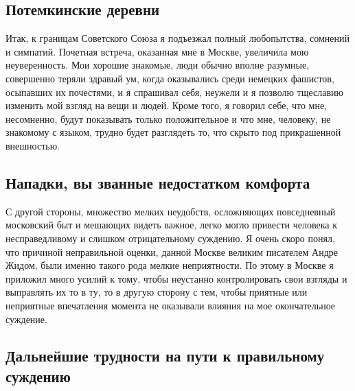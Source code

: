 \documentclass[12pt, a4paper, openany]{book}
\begin{document}
\subsection*{Потемкинские деревни}
Итак, к границам Советского Союза я подъезжал полный любопытства, сомнений и симпатий. Почетная встреча, оказанная мне в Москве, увеличила мою неуверенность. Мои хорошие знакомые, люди обычно вполне разумные, совершенно теряли здравый ум, когда оказывались среди немецких фашистов, осыпавших их почестями, и я спрашивал себя, неужели и я позволю тщеславию изменить мой взгляд на вещи и людей. Кроме того, я говорил себе, что мне, несомненно, будут показывать только положительное и что мне, человеку, не знакомому с языком, трудно будет разглядеть то, что скрыто под прикрашенной внешностью.

\subsection*{Нападки, вы званные недостатком комфорта}
  
С другой стороны, множество мелких неудобств, осложняющих повседневный московский быт и мешающих видеть важное, легко могло привести человека к несправедливому и слишком отрицательному суждению. Я очень скоро понял, что причиной неправильной оценки, данной Москве великим писателем Андре Жидом, были именно такого рода мелкие неприятности. По этому в Москве я приложил много усилий к тому, чтобы неустанно контролировать свои взгляды и выправлять их то в ту, то в другую сторону с тем, чтобы приятные или неприятные впечатления момента не оказывали влияния на мое окончательное суждение.


\subsection*{Дальнейшие трудности на пути к правильному суждению}
\end{document}
